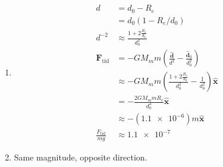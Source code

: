 \documentclass{article}
\renewcommand{\vec}[1]{\boldsymbol{\mathbf{#1}}}
\newcommand{\uvec}[1]{\hat{\vec{#1}}}
\begin{document}
\setcounter{subsection}{2}
\subsection{}

\begin{enumerate}
  \item

        \begin{align*}
          d                        & = d_0 - R_e                                                                                    \\
                                   & = d_0 (1 - R_e / d_0)                                                                          \\
          d^{-2}                   & \approx \frac{1 + 2 \frac{R_e}{d_0}}{d_0^2}                                                    \\
          \vec{F}_\text{tid}       & = -G M_m m \left( \frac{\uvec{d}}{d^2} - \frac{\uvec{d}_0}{d_0^2} \right)                      \\
                                   & \approx -G M_m m \left( \frac{1 + 2 \frac{R_e}{d_0}}{d_0^2} - \frac{1}{d_0^2} \right) \uvec{x} \\
                                   & = -\frac{2 G M_m m R_e}{d_0^3} \uvec{x}                                                        \\
                                   & \approx -(\num{1.1e-6}) m \uvec{x}                                                             \\
          \frac{F_\text{tid}}{m g} & \approx \num{1.1e-7}
        \end{align*}

  \item Same magnitude, opposite direction.
\end{enumerate}

\setcounter{subsection}{8}
\subsection{}
\end{document}
